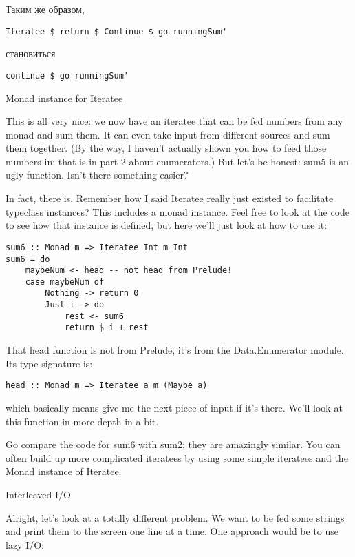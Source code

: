 Таким же образом,

\begin{lstlisting}
Iteratee $ return $ Continue $ go runningSum'
\end{lstlisting}

становиться

\begin{lstlisting}
continue $ go runningSum'
\end{lstlisting}

Monad instance for Iteratee

This is all very nice: we now have an iteratee that can be fed numbers from any monad and sum them. It can even take input from different sources and sum them together. (By the way, I haven't actually shown you how to feed those numbers in: that is in part 2 about enumerators.) But let's be honest: sum5 is an ugly function. Isn't there something easier?

In fact, there is. Remember how I said Iteratee really just existed to facilitate typeclass instances? This includes a monad instance. Feel free to look at the code to see how that instance is defined, but here we'll just look at how to use it:

\begin{lstlisting}
sum6 :: Monad m => Iteratee Int m Int
sum6 = do
    maybeNum <- head -- not head from Prelude!
    case maybeNum of
        Nothing -> return 0
        Just i -> do
            rest <- sum6
            return $ i + rest
\end{lstlisting}

That head function is not from Prelude, it's from the Data.Enumerator module. Its type signature is:

\begin{lstlisting}
head :: Monad m => Iteratee a m (Maybe a)
\end{lstlisting}

which basically means give me the next piece of input if it's there. We'll look at this function in more depth in a bit.

Go compare the code for sum6 with sum2: they are amazingly similar. You can often build up more complicated iteratees by using some simple iteratees and the Monad instance of Iteratee.

Interleaved I/O

Alright, let's look at a totally different problem. We want to be fed some strings and print them to the screen one line at a time. One approach would be to use lazy I/O:


